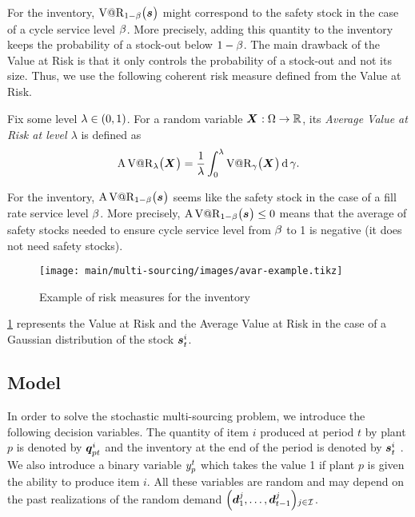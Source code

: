 For the inventory, $\VaR_{1-\servicelvl}\bracket{\va\inventory}$ might correspond to the safety stock in the case of a cycle service level $\beta$.
More precisely, adding this quantity to the inventory keeps the probability of a stock-out below $1-\beta$.
The main drawback of the Value at Risk is that it only controls the probability of a stock-out and not its size.
Thus, we use the following coherent risk measure defined from the Value at Risk.


Fix some level $\lambda\in\bracket{0,1}$. For a random variable $\va X:\scenarios\to\RR$, its \emph{Average Value at Risk at level $\lambda$} is defined as
\begin{equation}
\AVaR_{\lambda}\bracket{\va X} = \frac{1}{\lambda}\int_0^{\lambda}\VaR_{\gamma}\bracket{\va X}\diff\gamma.
\end{equation}


For the inventory, $\AVaR_{1-\servicelvl}\bracket{\va\inventory}$ seems like the safety stock in the case of a fill rate service level $\beta$.
More precisely, $\AVaR_{1-\servicelvl}\bracket{\va\inventory}\le 0$ means that the average of safety stocks needed to ensure cycle service level from $\beta$ to 1 is negative (\ie it does not need safety stocks).


\begin{figure}[h]
  \centering
  \texttt{[image: main/multi-sourcing/images/avar-example.tikz]}
  \caption{Example of risk measures for the inventory}
  \label{fig:avar-examples}
\end{figure}


\cref{fig:avar-examples} represents the Value at Risk and the Average Value at Risk in the case of a Gaussian distribution of the stock $\va\inventory_t^i$.





\subsection{Model}


In order to solve the stochastic multi-sourcing problem, we introduce the following decision variables.
The quantity of item $i$ produced at period $t$ by plant $p$ is denoted by $\va\quantity_{pt}^i$ and the inventory at the end of the period is denoted by $\va\inventory_t^i$ .
We also introduce a binary variable $y_p^t$ which takes the value 1 if plant $p$ is given the ability to produce item $i$.
All these variables are random and may depend on the past realizations of the random demand $\bracket{\va\demand_1^j,\ldots,\va\demand_{t-1}^j}_{j\in\REF}$.



